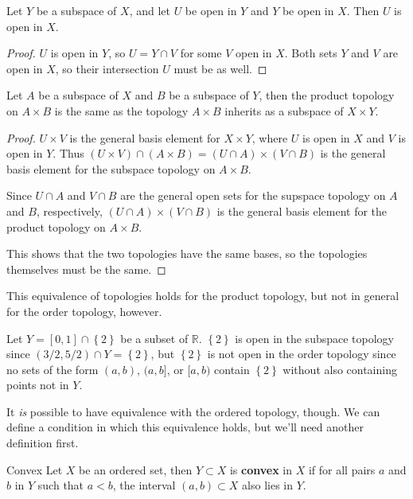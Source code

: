 \documentclass[10pt]{report}
\begin{document}
\begin{prop}
	Let $Y$ be a subspace of $X$, and let $U$ be open in $Y$ and $Y$ be open in $X$. Then $U$ is open in $X$.
\end{prop}
\begin{proof}
	$U$ is open in $Y$, so $U=Y \cap V$ for some $V$ open in $X$. Both sets $Y$ and $V$ are open in $X$, so their intersection $U$ must be as well.
\end{proof}

\begin{thrm}{}{}
Let $A$ be a subspace of $X$ and $B$ be a subspace of $Y$, then the product topology on $A \times B$ is the same as the topology $A \times B$ inherits as a subspace of $X \times Y$.
\end{thrm}
\begin{proof}
	$U \times V$ is the general basis element for $X \times Y$, where $U$ is open in $X$ and $V$ is open in $Y$. Thus $(U \times V) \cap (A \times B) = (U \cap A) \times (V \cap B)$ is the general basis element for the subspace topology on $A \times B$.

	Since $U \cap A$ and $V \cap B$ are the general open sets for the supspace topology on $A$ and $B$, respectively, $(U \cap A) \times (V \cap B)$ is the general basis element for the product topology on $A \times B$.

	This shows that the two topologies have the same bases, so the topologies themselves must be the same.
\end{proof}

This equivalence of topologies holds for the product topology, but not in general for the order topology, however.

\begin{ex}{}{}
	Let $Y=[0,1] \cap \left\{ 2 \right\}$ be a subset of $\mathbb{R}$. $\left\{ 2 \right\}$ is open in the subspace topology since $(3/2, 5/2) \cap Y = \left\{ 2 \right\}$, but $\left\{ 2 \right\}$ is not open in the order topology since no sets of the form $(a,b)$, $(a,b]$, or $[a,b)$ contain $\left\{ 2 \right\}$ without also containing points not in $Y$.
\end{ex}

It \textit{is} possible to have equivalence with the ordered topology, though. We can define a condition in which this equivalence holds, but we'll need another definition first.

\begin{defn}{Convex}{}
	Let $X$ be an ordered set, then $Y \subset X$ is \textbf{convex} in $X$ if for all pairs $a$ and $b$ in $Y$ such that $a<b$, the interval $(a,b) \subset X$ also lies in $Y$.
\end{defn}
\end{document}
